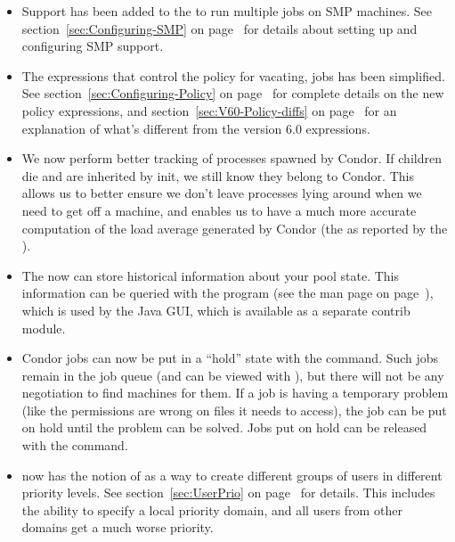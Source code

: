 \begin{itemize}

\item Support has been added to the  to run multiple
jobs on SMP machines.
See section~\ref{sec:Configuring-SMP} on
page~\pageref{sec:Configuring-SMP} for details about setting up and
configuring SMP support.

\item The expressions that control the  policy for
vacating, jobs has been simplified.
See section~\ref{sec:Configuring-Policy} on
page~\pageref{sec:Configuring-Policy} for complete details on the new
policy expressions, and section~\ref{sec:V60-Policy-diffs} on
page~\pageref{sec:V60-Policy-diffs} for an explanation of what's
different from the version 6.0 expressions.

\item We now perform better tracking of processes spawned by Condor.
If children die and are inherited by init, we still know they belong
to Condor.
This allows us to better ensure we don't leave processes lying around
when we need to get off a machine, and enables us to have a much more
accurate computation of the load average generated by Condor (the
 as reported by the ). 

\item The  now can store historical information
about your pool state.
This information can be queried with the  program (see
the man page on page~\pageref{man-condor-stats}), which is used by the
 Java GUI, which is available as a separate contrib
module.

\item Condor jobs can now be put in a ``hold'' state with the
 command.
Such jobs remain in the job queue (and can be viewed with ),
but there will not be any negotiation to find machines for them.
If a job is having a temporary problem (like the permissions are 
wrong on files it needs to access), the job can be put on hold until
the problem can be solved.
Jobs put on hold can be released with the  command.

\item {} now has the notion of  as a
way to create different groups of users in different priority levels.
See section~\ref{sec:UserPrio} on page~\pageref{sec:UserPrio} for
details.
This includes the ability to specify a local priority domain, and all
users from other domains get a much worse priority.


\end{itemize}
